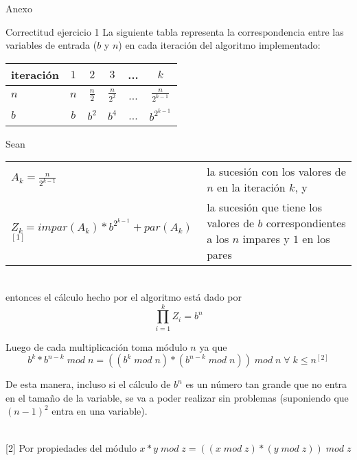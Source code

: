 	\begin{subsection}{Anexo}
		\begin{subsubsection}{Correctitud ejercicio 1}
		La siguiente tabla representa la correspondencia entre las variables de entrada ($b$ y $n$) en 
		cada iteración del algoritmo implementado:

		\vspace{0.5cm}
		\begin{center}
		\begin{tabular}{|l|c|c|c|c|c|}
			\hline
			iteración   & $1$ & $2$           & $3$             & ... & $k$ \\
			\hline
			$n$         & $n$ & $\frac{n}{2}$ & $\frac{n}{2^2}$ & ... & $\frac{n}{2^{k-1}}$ \\
			\hline
			$b$         & $b$ & $b^2$         & $b^4$           & ... & $b^{2^{k-1}}$ \\
			\hline
		\end{tabular}
		\end{center}

		\vspace{0.5cm}
		\noindent Sean \\
		\indent
		\begin{tabular}{lp{6cm}}
			$A_k = \frac{n}{2^{k-1}}$ & la sucesión con los valores de $n$ en la iteración $k$, y \\
			$Z_k = impar(A_k) * b^{2^{k-1}} + par( A_k )$ $^{[1]}$ & la sucesión que tiene los valores de $b$ corres\-pondientes a los $n$ impares y $1$ en los pares
		\end{tabular} \\
		\vspace{0.2cm}
		entonces el cálculo hecho por el algoritmo está dado por 
		$$\displaystyle\prod_{i=1}^k Z_i = b^n$$

		Luego de cada multiplicación toma módulo $n$ ya que
			$$b^k * b^{n-k}\; mod\;n = ((b^k\;mod\;n)*(b^{n-k}\;mod\;n))\;mod\;n\;\forall\;k\leq n ^{[2]}$$ 

		De esta manera, incluso si el cálculo de $b^n$ es un número tan grande que no entra en el 
		tamaño de la variable, se va a poder realizar sin problemas (suponiendo que $(n-1)^2$ entra 
		en una variable).


		\vspace{0.5cm}
		 \\
		\vspace{0.5cm}
		{\footnotesize [2] Por propiedades del módulo $x*y\; mod \; z = ((x\; mod\; z)*(y\; mod\; z))\;mod\; z$ } \\
		\end{subsubsection}
	\end{subsection}

